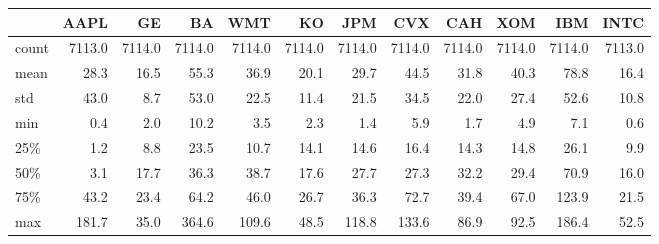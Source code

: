 \begin{tabular}{lrrrrrrrrrrr}
\toprule
{} &    AAPL &      GE &      BA &     WMT &      KO &     JPM &     CVX &     CAH &     XOM &     IBM &    INTC \\
\midrule
count &  7113.0 &  7114.0 &  7114.0 &  7114.0 &  7114.0 &  7114.0 &  7114.0 &  7114.0 &  7114.0 &  7114.0 &  7113.0 \\
mean  &    28.3 &    16.5 &    55.3 &    36.9 &    20.1 &    29.7 &    44.5 &    31.8 &    40.3 &    78.8 &    16.4 \\
std   &    43.0 &     8.7 &    53.0 &    22.5 &    11.4 &    21.5 &    34.5 &    22.0 &    27.4 &    52.6 &    10.8 \\
min   &     0.4 &     2.0 &    10.2 &     3.5 &     2.3 &     1.4 &     5.9 &     1.7 &     4.9 &     7.1 &     0.6 \\
25\%   &     1.2 &     8.8 &    23.5 &    10.7 &    14.1 &    14.6 &    16.4 &    14.3 &    14.8 &    26.1 &     9.9 \\
50\%   &     3.1 &    17.7 &    36.3 &    38.7 &    17.6 &    27.7 &    27.3 &    32.2 &    29.4 &    70.9 &    16.0 \\
75\%   &    43.2 &    23.4 &    64.2 &    46.0 &    26.7 &    36.3 &    72.7 &    39.4 &    67.0 &   123.9 &    21.5 \\
max   &   181.7 &    35.0 &   364.6 &   109.6 &    48.5 &   118.8 &   133.6 &    86.9 &    92.5 &   186.4 &    52.5 \\
\bottomrule
\end{tabular}

